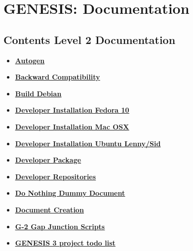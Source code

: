 \documentclass[12pt]{article}
\begin{document}
\section*{GENESIS: Documentation}

\subsection*{Contents Level 2 Documentation}

\begin{itemize}

\item \href{../autogen/autogen.pdf}{\bf \underline{Autogen}}

\item \href{../backward-compatibility/backward-compatibility.pdf}{\bf \underline{Backward Compatibility}}

\item \href{../build-debian/build-debian.pdf}{\bf \underline{Build Debian}}

\item \href{../installation-fedora10/installation-fedora10.pdf}{\bf \underline{Developer Installation Fedora 10}}

\item \href{../installation-osx/installation-osx.pdf}{\bf \underline{Developer Installation Mac OSX}}

\item \href{../installation-ubuntu-lennysid/installation-ubuntu-lennysid.pdf}{\bf \underline{Developer Installation Ubuntu Lenny/Sid}}

\item \href{../developer-package/developer-package.pdf}{\bf \underline{Developer Package}}

\item \href{../developer-repository/developer-repository.pdf}{\bf \underline{Developer Repositories}}

\item \href{../do-nothing/do-nothing.pdf}{\bf \underline{Do Nothing Dummy Document}}

\item \href{../document-create/document-create.pdf}{\bf \underline{Document Creation}}

\item \href{../g2-gap-junction/g2-gap-junction.pdf}{\bf \underline{G-2 Gap Junction Scripts}}

\item \href{../project-todo/project-todo.pdf}{\bf \underline{GENESIS 3 project todo list}}


\end{itemize}
\end{document}
